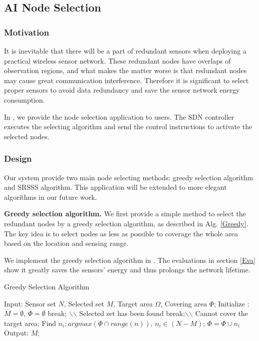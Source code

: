 \subsection{AI Node Selection}

\subsubsection{Motivation}

It is inevitable that there will be a part of redundant sensors when deploying a 
practical wireless sensor network. These redundant nodes have overlaps of
observation regions, and what makes the matter worse is that redundant nodes
may cause great communication interference. Therefore it is significant to select 
proper sensors to avoid data redundancy and save the sensor network energy consumption.

In {\sdn}, we provide the node selection application to users. The SDN controller executes the 
selecting algorithm and send the control instructions to activate the selected nodes.

\subsubsection{Design} Our {\sdn} system provide two main node selecting methods: 
greedy selection algorithm and SRSSS algorithm. This application will be extended to more elegant 
algorithms in our future work. 

\textbf{Greedy selection algorithm.} We first provide a simple method to select 
the redundant nodes by a greedy selection algorithm, as described in Alg. \ref{Greedy}. 
The key idea is to select nodes as less as possible to coverage the whole area
 based on the location and sensing range. 
 
 We implement the greedy selection algorithm in {\sdn}. The evaluations in section \ref{Eva} 
 show it greatly saves the sensors' energy and thus prolongs the network lifetime.

\begin{algorithm}
\caption{Greedy Selection Algorithm}
\label{Greedy}
\begin{algorithmic}[1]
\STATE Input: Sensor set $N$, Selected set $M$, Target area $\Omega$, Covering area $\Phi$;
\STATE Initialize : $M = \emptyset$, $\Phi = \emptyset$
    \IF{$\Phi = \Omega $}
        \STATE break; $\backslash$$\backslash$ Selected set has been found
    \ENDIF
    	 \STATE break;$\backslash$$\backslash$ Cannot cover the target area;
    \ENDIF
    \STATE Find $n_i : argmax(\Phi \cap range(n))$, $n_i \in (N-M)$;
    \STATE $\Phi = \Phi \cup {n_i}$
\ENDWHILE
\STATE Output: $M$;
\end{algorithmic}
\end{algorithm}

